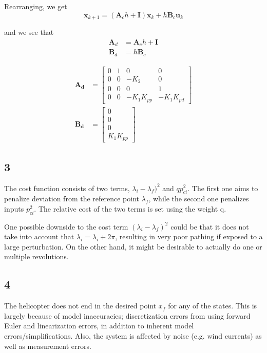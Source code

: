 Rearranging, we get
\begin{equation}
    \mathbf{x}_{k+1} = (\mathbf{A}_ch + \mathbf{I})\mathbf{x}_k + h\mathbf{B}_c\mathbf{u}_k
\end{equation}

and we see that
\begin{subequations}
    \begin{align}
        \mathbf{A}_d &= \mathbf{A}_ch+\mathbf{I} \\
        \mathbf{B}_d &= h\mathbf{B}_c
    \end{align}

\end{subequations}

\begin{subequations}
    \begin{align}
        \mathbf{A_d} &= \begin{bmatrix}
        0 & 1 & 0 & 0\\
        0 & 0 & -K_2 & 0\\
        0 & 0 & 0 & 1\\
        0 & 0 & -K_1K_{pp} & -K_1K_{pd}
        \end{bmatrix}\\
        \mathbf{B_d} &= \begin{bmatrix}
        0\\
        0\\
        0\\
        K_1K_{pp}
    \end{bmatrix}
    \end{align}
\end{subequations}

\subsection{3}
The cost function  consists of two terms, $\lambda_i - \lambda_f)^2$ and $qp_{ci}^2$. The first one aims to penalize deviation from the reference point $\lambda_f$, while the second one penalizes inputs $p_{ci}^2$. The relative cost of the two terms is set using the weight q.

One possible downside to the cost term $(\lambda_i - \lambda_f)^2$ could be that it does not take into account that $\lambda_i = \lambda_ i + 2\pi$, resulting in very poor pathing if exposed to a large perturbation. On the other hand, it might be desirable to actually do one or multiple revolutions.

\subsection{4}
The helicopter does not end in the desired point $x_f$ for any of the states. This is largely  because of model inaccuracies; discretization errors from using forward Euler and linearization errors, in addition to inherent model errors/simplifications. Also, the system is affected by noise (e.g. wind currents) as well as measurement errors.
